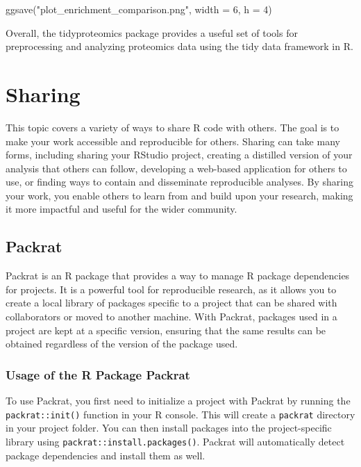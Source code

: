 \documentclass[
]{book}
\newenvironment{Shaded}{\begin{snugshade}}{\end{snugshade}}
\newcommand{\AttributeTok}[1]{\textcolor[rgb]{0.77,0.63,0.00}{#1}}
\newcommand{\DecValTok}[1]{\textcolor[rgb]{0.00,0.00,0.81}{#1}}
\newcommand{\FunctionTok}[1]{\textcolor[rgb]{0.00,0.00,0.00}{#1}}
\newcommand{\NormalTok}[1]{#1}
\newcommand{\StringTok}[1]{\textcolor[rgb]{0.31,0.60,0.02}{#1}}
\begin{document}
\begin{Shaded}
\begin{Highlighting}[]
\FunctionTok{ggsave}\NormalTok{(}\StringTok{"plot\_enrichment\_comparison.png"}\NormalTok{,}
       \AttributeTok{width =} \DecValTok{6}\NormalTok{, }\AttributeTok{h =} \DecValTok{4}\NormalTok{)}
\end{Highlighting}
\end{Shaded}

Overall, the tidyproteomics package provides a useful set of tools for preprocessing and analyzing proteomics data using the tidy data framework in R.

\hypertarget{sharing}{%
\chapter{Sharing}\label{sharing}}

This topic covers a variety of ways to share R code with others. The goal is to make your work accessible and reproducible for others. Sharing can take many forms, including sharing your RStudio project, creating a distilled version of your analysis that others can follow, developing a web-based application for others to use, or finding ways to contain and disseminate reproducible analyses. By sharing your work, you enable others to learn from and build upon your research, making it more impactful and useful for the wider community.

\hypertarget{packrat}{%
\section{Packrat}\label{packrat}}

Packrat is an R package that provides a way to manage R package dependencies for projects. It is a powerful tool for reproducible research, as it allows you to create a local library of packages specific to a project that can be shared with collaborators or moved to another machine. With Packrat, packages used in a project are kept at a specific version, ensuring that the same results can be obtained regardless of the version of the package used.

\hypertarget{usage-of-the-r-package-packrat}{%
\subsection{Usage of the R Package Packrat}\label{usage-of-the-r-package-packrat}}

To use Packrat, you first need to initialize a project with Packrat by running the \texttt{packrat::init()} function in your R console. This will create a \texttt{packrat} directory in your project folder. You can then install packages into the project-specific library using \texttt{packrat::install.packages()}. Packrat will automatically detect package dependencies and install them as well.
\end{document}
